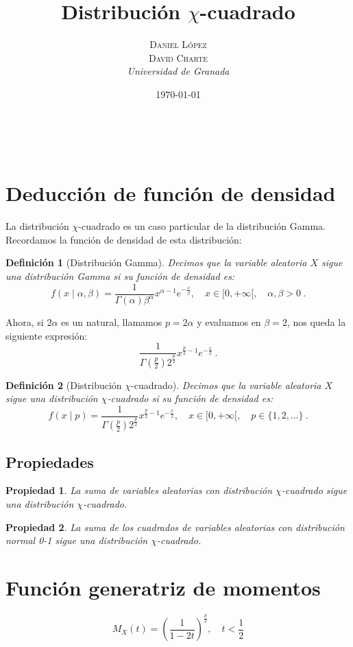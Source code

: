 \documentclass[a4paper, 10pt]{article} %
\title{\textbf{Distribución $\chi$-cuadrado}\\ %
\vspace{20 pt}
} %
\author{\textsc{Daniel López\\
David Charte} %
\\{\textit{Universidad de Granada}}} %
\date{\today} %
\makeatletter
\renewcommand{\maketitle}{ %
\begin{center} %
{\Huge\@title} %
\end{center}

\vspace{20pt} %

\begin{flushright} %
{\large\@author} %
\\\@date %

\vspace{40pt} %
\end{flushright}
\renewcommand{\baselinestretch}{0.5}

}
\newtheorem{definition}{Definición}[section]
\newtheorem{property}{Propiedad}[section]
\makeatother
\begin{document}
\maketitle
\tableofcontents
\setcounter{page}{1}
\pagebreak

\section{Deducción de función de densidad}
La distribución $\chi$-cuadrado es un caso particular de la distribución Gamma. Recordamos la función de densidad de esta distribución:

\begin{definition}[Distribución Gamma]
  Decimos que la variable aleatoria $X$ sigue una distribución Gamma si su función de densidad es:
  $$f(x\mid \alpha, \beta) = \frac 1 {\Gamma(\alpha)\beta^\alpha}x^{\alpha-1}e^{-\frac x \beta},\quad x\in[0,+\infty[,\quad \alpha,\beta>0~.$$
\end{definition}

Ahora, si $2\alpha$ es un natural, llamamos $p=2\alpha$ y evaluamos en $\beta=2$, nos queda la siguiente expresión:
$$\frac 1 {\Gamma(\frac p 2)2^{\frac p 2}}x^{\frac p 2-1}e^{-\frac x 2}~.$$

\begin{definition}[Distribución $\chi$-cuadrado]
  Decimos que la variable aleatoria $X$ sigue una distribución $\chi$-cuadrado si su función de densidad es:
  $$f(x\mid p) = \frac 1 {\Gamma(\frac p 2)2^{\frac p 2}}x^{\frac p 2-1}e^{-\frac x 2},\quad x\in[0,+\infty[,\quad p\in\{1,2,\dots\}~.$$
\end{definition}

\subsection{Propiedades}

\begin{property}
  La suma de variables aleatorias con distribución $\chi$-cuadrado sigue una distribución $\chi$-cuadrado.
\end{property}

\begin{property}
  La suma de los cuadrados de variables aleatorias con distribución normal 0-1 sigue una distribución $\chi$-cuadrado.
\end{property}

\section{Función generatriz de momentos}
$$M_X(t)=\left(\frac 1 {1 - 2t}\right)^{\frac p 2},\quad t<\frac 1 2$$
\end{document}
